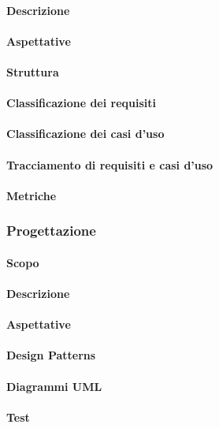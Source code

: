 \paragraph{Descrizione}
\paragraph{Aspettative}
\paragraph{Struttura}
\paragraph{Classificazione dei requisiti}
\paragraph{Classificazione dei casi d'uso}
\paragraph{Tracciamento di requisiti e casi d'uso}
\paragraph{Metriche}

\subsubsection{Progettazione}
\paragraph{Scopo}
\paragraph{Descrizione}
\paragraph{Aspettative}
\paragraph{Design Patterns}
\paragraph{Diagrammi UML}
\paragraph{Test}

